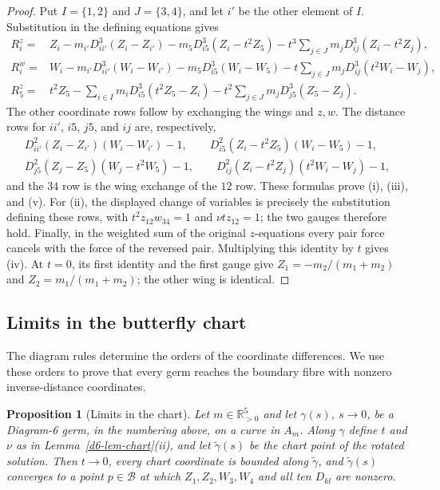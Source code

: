 \documentclass[Threeside,11pt]{article}
\newtheorem{proposition}[theorem]{Proposition}
\theoremstyle{definition}
\theoremstyle{remark}
\numberwithin{equation}{section}
\theoremstyle{remark}
\newcommand{\Rp}{\mathbb{R}_{>0}}
\begin{document}
{\begin{proof}
Put $I=\{1,2\}$ and $J=\{3,4\}$, and let $i'$ be the other element of $I$.
Substitution in the defining equations gives
\begin{align*}
R_i^z={}&Z_i-m_{i'}D_{ii'}^3(Z_i-Z_{i'})
 -m_5D_{i5}^3(Z_i-t^2Z_5)
 -t^3\sum_{j\in J}m_jD_{ij}^3(Z_i-t^2Z_j),\\
R_i^w={}&W_i-m_{i'}D_{ii'}^3(W_i-W_{i'})
 -m_5D_{i5}^3(W_i-W_5)
 -t\sum_{j\in J}m_jD_{ij}^3(t^2W_i-W_j),\\
R_5^z={}&t^2Z_5-\sum_{i\in I}m_iD_{i5}^3(t^2Z_5-Z_i)
 -t^2\sum_{j\in J}m_jD_{j5}^3(Z_5-Z_j).
\end{align*}
The other coordinate rows follow by exchanging the wings and $z,w$.
The distance rows for $ii'$, $i5$, $j5$, and $ij$ are, respectively,
\begin{gather*}
D_{ii'}^2(Z_i-Z_{i'})(W_i-W_{i'})-1,\qquad
D_{i5}^2(Z_i-t^2Z_5)(W_i-W_5)-1,\\
D_{j5}^2(Z_j-Z_5)(W_j-t^2W_5)-1,\qquad
D_{ij}^2(Z_i-t^2Z_j)(t^2W_i-W_j)-1,
\end{gather*}
and the $34$ row is the wing exchange of the $12$ row.
These formulas prove (i), (iii), and (v). For (ii), the displayed change of
variables is precisely the substitution defining these rows, with
$t^2z_{12}w_{34}=1$ and $\nu tz_{12}=1$; the two gauges therefore hold.
Finally, in the weighted sum of the original $z$-equations every pair force
cancels with the force of the reversed pair. Multiplying this identity by
$t$ gives (iv). At $t=0$, its first identity and the first gauge give
$Z_1=-m_2/(m_1+m_2)$ and $Z_2=m_1/(m_1+m_2)$; the other wing is identical.
\end{proof}

}\subsection{Limits in the butterfly chart}

The diagram rules determine the orders of the coordinate differences.
We use these orders to prove that every germ reaches the boundary fibre
with nonzero inverse-distance coordinates.

\begin{proposition}[Limits in the chart]\label{prop:d6-cover}
Let $m\in\Rp^5$ and let $\gamma(s)$, $s\to0$, be a Diagram-6 germ, in the numbering above, on a
curve in $A_m$.  Along $\gamma$ define $t$ and $\nu$ as in Lemma~\ref{d6-lem-chart}(ii), and
let $\tilde\gamma(s)$ be the chart point of the rotated solution.  Then $t\to0$, every chart
coordinate is bounded along $\tilde\gamma$, and $\tilde\gamma(s)$ converges to a point
$p\in\mathcal B$ at which $Z_1,Z_2,W_3,W_4$ and all ten $D_{kl}$ are nonzero.
\end{proposition}
\end{document}
